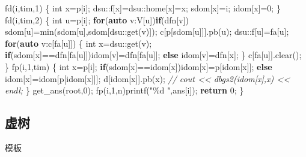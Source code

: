 \documentclass[
]{article}
\newenvironment{Shaded}{}{}
\newcommand{\CommentTok}[1]{\textcolor[rgb]{0.38,0.63,0.69}{\textit{#1}}}
\newcommand{\ControlFlowTok}[1]{\textcolor[rgb]{0.00,0.44,0.13}{\textbf{#1}}}
\newcommand{\DataTypeTok}[1]{\textcolor[rgb]{0.56,0.13,0.00}{#1}}
\newcommand{\DecValTok}[1]{\textcolor[rgb]{0.25,0.63,0.44}{#1}}
\newcommand{\KeywordTok}[1]{\textcolor[rgb]{0.00,0.44,0.13}{\textbf{#1}}}
\newcommand{\NormalTok}[1]{#1}
\newcommand{\SpecialCharTok}[1]{\textcolor[rgb]{0.25,0.44,0.63}{#1}}
\newcommand{\StringTok}[1]{\textcolor[rgb]{0.25,0.44,0.63}{#1}}
\begin{document}
\begin{Shaded}
\begin{Highlighting}[]
\NormalTok{    fd(i,tim,}\DecValTok{1}\NormalTok{)}
\NormalTok{    \{}
        \DataTypeTok{int}\NormalTok{ x=p[i];}
\NormalTok{        dsu::f[x]=dsu::home[x]=x;}
\NormalTok{        sdom[x]=i;}
\NormalTok{        idom[x]=}\DecValTok{0}\NormalTok{;}
\NormalTok{    \}}
\NormalTok{    fd(i,tim,}\DecValTok{2}\NormalTok{)}
\NormalTok{    \{}
        \DataTypeTok{int}\NormalTok{ u=p[i];}
        \ControlFlowTok{for}\NormalTok{(}\KeywordTok{auto}\NormalTok{ v:V[u])}\ControlFlowTok{if}\NormalTok{(dfn[v])}
\NormalTok{            sdom[u]=min(sdom[u],sdom[dsu::get(v)]);}
\NormalTok{        c[p[sdom[u]]].pb(u);}
\NormalTok{        dsu::f[u]=fa[u];}
        \ControlFlowTok{for}\NormalTok{(}\KeywordTok{auto}\NormalTok{ v:c[fa[u]])}
\NormalTok{        \{}
            \DataTypeTok{int}\NormalTok{ x=dsu::get(v);}
            \ControlFlowTok{if}\NormalTok{(sdom[x]==dfn[fa[u]])idom[v]=dfn[fa[u]];}
            \ControlFlowTok{else}\NormalTok{ idom[v]=dfn[x];}
\NormalTok{        \}}
\NormalTok{        c[fa[u]].clear();}
\NormalTok{    \}   }
\NormalTok{    fp(i,}\DecValTok{1}\NormalTok{,tim)}
\NormalTok{    \{}
        \DataTypeTok{int}\NormalTok{ x=p[i];}
        \ControlFlowTok{if}\NormalTok{(sdom[x]==idom[x])idom[x]=p[idom[x]];}
        \ControlFlowTok{else}\NormalTok{ idom[x]=idom[p[idom[x]]];}
\NormalTok{        d[idom[x]].pb(x);}
        \CommentTok{// cout \textless{}\textless{} dbgs2(idom[x],x) \textless{}\textless{} endl;}
\NormalTok{    \}}
\NormalTok{    get\_ans(root,}\DecValTok{0}\NormalTok{);}
\NormalTok{    fp(i,}\DecValTok{1}\NormalTok{,n)printf(}\StringTok{"}\SpecialCharTok{\%d}\StringTok{ "}\NormalTok{,ans[i]);}
    \ControlFlowTok{return} \DecValTok{0}\NormalTok{;}
\NormalTok{\}}
\end{Highlighting}
\end{Shaded}

\hypertarget{ux865aux6811}{%
\subsection{虚树}\label{ux865aux6811}}

模板
\end{document}
